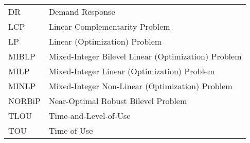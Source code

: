 
\chapter*{\abbrevname}
\pagestyle{pagenumber}

\begin{longtable}{lp{5in}}
DR       & Demand Response\\
LCP & Linear Complementarity Problem \\
LP & Linear (Optimization) Problem\\
MIBLP & Mixed-Integer Bilevel Linear (Optimization) Problem\\
MILP & Mixed-Integer Linear (Optimization) Problem \\
MINLP & Mixed-Integer Non-Linear (Optimization) Problem \\
NORBiP & Near-Optimal Robust Bilevel Problem\\
TLOU  & Time-and-Level-of-Use\\
TOU  & Time-of-Use
\end{longtable}
